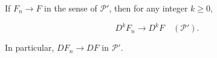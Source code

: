If $F_n \to F$ in the sense of $\mathcal{P}'$, then for any integer $k \geq 0$,

$$D^k F_n \to D^k F \quad (\mathcal{P}').$$

In particular, $DF_n \to DF$ in $\mathcal{P}'$.
